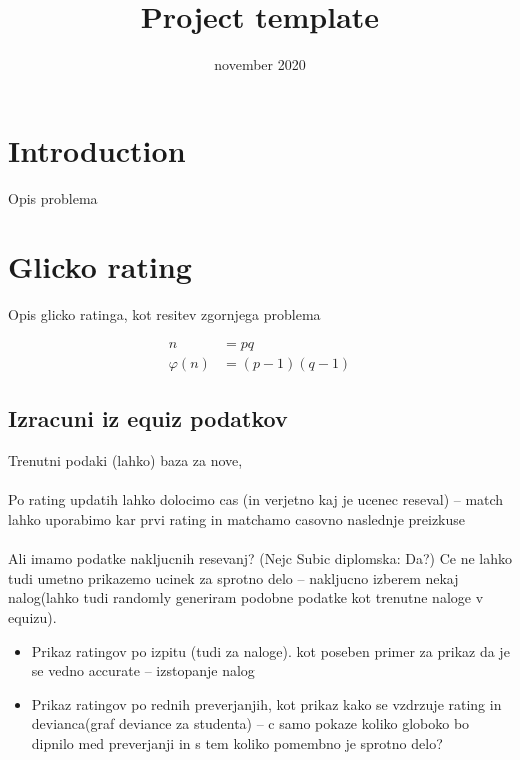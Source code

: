 \documentclass{IEEEtran}
\title{Project template}
\date{november 2020}
\makeatletter
\let\old@subsection\subsection
\renewcommand{\subsection}[1]{\bigskip\old@subsection{#1}\@afterindentfalse\@afterheading}
\makeatother
\begin{document}
\maketitle

\section{Introduction}
\label{sec:intro}

Opis problema

\section{Glicko rating}
\label{sec:glicko}
Opis glicko ratinga, kot resitev zgornjega problema

\begin{align}
n &= pq \nonumber \\
\varphi(n) &= (p-1)(q-1) \label{eqn:phi}
\end{align}


\subsection{Izracuni iz equiz podatkov}

Trenutni podaki (lahko) baza za nove,
\\
\\
Po rating updatih lahko dolocimo cas (in verjetno kaj je ucenec reseval) -- match lahko uporabimo kar prvi rating in matchamo casovno naslednje preizkuse
\\
\\
Ali imamo podatke nakljucnih resevanj? (Nejc Subic diplomska: Da?)
Ce ne lahko tudi umetno prikazemo ucinek za sprotno delo -- nakljucno izberem nekaj nalog(lahko tudi randomly generiram podobne podatke kot trenutne naloge v equizu).
\\
\begin{itemize}
    \item Prikaz ratingov po izpitu (tudi za naloge). kot poseben primer za prikaz da je se vedno accurate -- izstopanje nalog
    \item Prikaz ratingov po rednih preverjanjih, kot prikaz kako se vzdrzuje rating in devianca(graf deviance za studenta) -- c samo pokaze koliko globoko bo dipnilo med preverjanji in s tem koliko pomembno je sprotno delo?
\end{itemize}
\hfill
\\
\\
\\
\\
\\
\\
\end{document}
